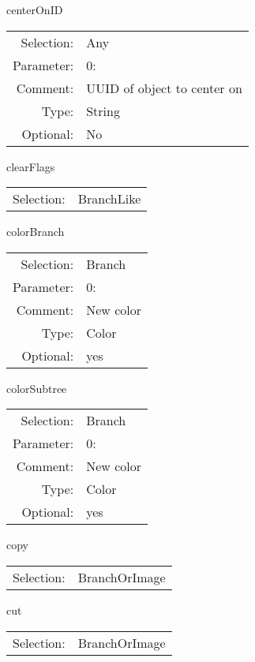 \item centerOnID\\
\begin{tabular}{rl}
  Selection: & Any\\
   Parameter: &  0:\\
        Comment: & UUID of object to center on\\
           Type: & String\\
       Optional: &  No\\
\end{tabular}

\item clearFlags\\
\begin{tabular}{rl}
  Selection: & BranchLike\\
\end{tabular}

\item colorBranch\\
\begin{tabular}{rl}
  Selection: & Branch\\
   Parameter: &  0:\\
        Comment: & New color\\
           Type: & Color\\
       Optional: &  yes\\
\end{tabular}

\item colorSubtree\\
\begin{tabular}{rl}
  Selection: & Branch\\
   Parameter: &  0:\\
        Comment: & New color\\
           Type: & Color\\
       Optional: &  yes\\
\end{tabular}

\item copy\\
\begin{tabular}{rl}
  Selection: & BranchOrImage\\
\end{tabular}

\item cut\\
\begin{tabular}{rl}
  Selection: & BranchOrImage\\
\end{tabular}

